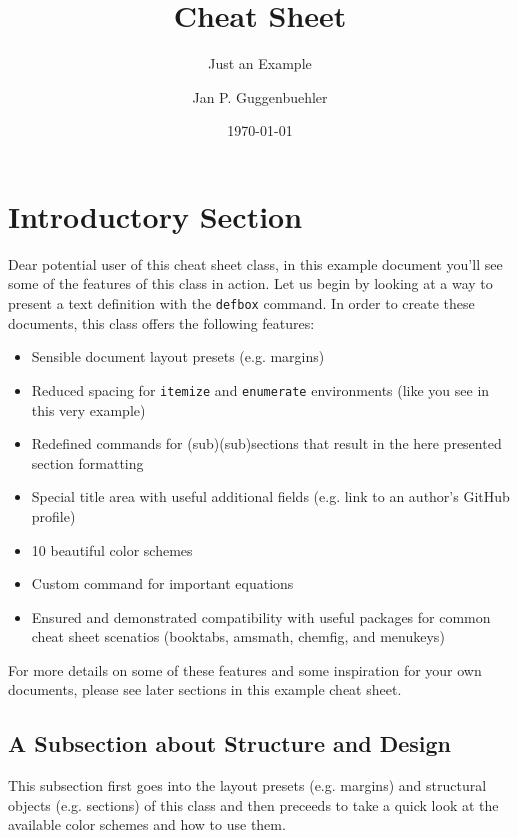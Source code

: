 \documentclass{modernCS}
\begin{document}
\title{Cheat Sheet}
\subtitle{Just an Example}
\author{Jan P. Guggenbuehler}
\date{\today{}}
\maketitle

\section{Introductory Section}
Dear potential user of this cheat sheet class, in this example document you'll see some of the features of this class in action. Let us begin by looking at a way to present a text definition with the \texttt{defbox} command.
In order to create these documents, this class offers the following features:
\begin{itemize}
	\item Sensible document layout presets (e.g. margins)
	\item Reduced spacing for \texttt{itemize} and \texttt{enumerate} environments (like you see in this very example)
	\item Redefined commands for (sub)(sub)sections that result in the here presented section formatting
	\item Special title area with useful additional fields (e.g. link to an author's GitHub profile)
	\item 10 beautiful color schemes
	\item Custom command for important equations
	\item Ensured and demonstrated compatibility with useful packages for common cheat sheet scenatios (booktabs, amsmath, chemfig, and menukeys)
\end{itemize}
For more details on some of these features  and some inspiration for your own documents, please see later sections in this example cheat sheet.

\subsection{A Subsection about Structure and Design}
This subsection first goes into the layout presets (e.g. margins) and structural objects (e.g. sections) of this class and then preceeds to take a quick look at the available color schemes and how to use them.
\end{document}
